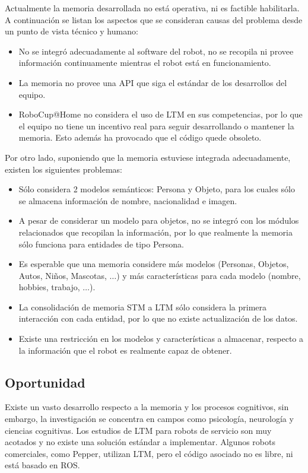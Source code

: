 \documentclass[12pt,letterpaper,spanish]{article}
\begin{document}
Actualmente la memoria desarrollada no est\'a operativa, ni es factible habilitarla. A continuaci\'on se listan los aspectos que se consideran causas del problema desde un punto de vista t\'ecnico y humano:
\begin{itemize}
\item No se integr\'o adecuadamente al software del robot, no se recopila ni provee informaci\'on continuamente mientras el robot est\'a en funcionamiento.
\item La memoria no provee una API que siga el est\'andar de los desarrollos del equipo. 
\item RoboCup@Home no considera el uso de LTM en sus competencias, por lo que el equipo no tiene un incentivo real para seguir desarrollando o mantener la memoria. Esto adem\'as ha provocado que el c\'odigo quede obsoleto.
\end{itemize}

Por otro lado, suponiendo que la memoria estuviese integrada adecuadamente, existen los siguientes problemas:
\begin{itemize}
\item S\'olo considera 2 modelos sem\'anticos: Persona y Objeto, para los cuales s\'olo se almacena informaci\'on de nombre, nacionalidad e imagen.
\item A pesar de considerar un modelo para objetos, no se integr\'o con los m\'odulos relacionados que recopilan la informaci\'on, por lo que realmente la memoria s\'olo funciona para entidades de tipo Persona.
\item Es esperable que una memoria considere m\'as modelos (Personas, Objetos, Autos, Ni\~nos, Mascotas, $\ldots$) y m\'as caracter\'isticas para cada modelo (nombre, hobbies, trabajo, $\ldots$).
\item La consolidaci\'on de memoria STM a LTM s\'olo considera la primera interacci\'on con cada entidad, por lo que no existe actualizaci\'on de los datos.
\item Existe una restricci\'on en los modelos y caracter\'isticas a almacenar, respecto a la informaci\'on que el robot es realmente capaz de obtener.
\end{itemize}


\subsection{Oportunidad}

Existe un vasto desarrollo respecto a la memoria y los procesos cognitivos, sin embargo, la investigaci\'on se concentra en campos como psicolog\'ia, neurolog\'ia y ciencias cognitivas. 
Los estudios de LTM para robots de servicio son muy acotados y no existe una soluci\'on est\'andar a implementar. Algunos robots comerciales, como Pepper, utilizan LTM, pero el c\'odigo asociado no es libre, ni est\'a basado en ROS.\\
\end{document}
